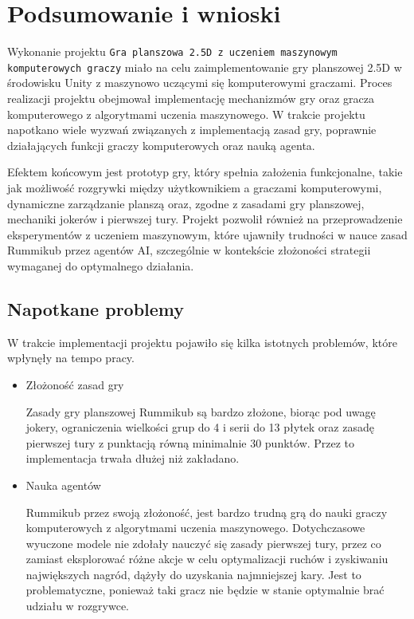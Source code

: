 \documentclass[a4paper,twoside,12pt]{book}
\begin{document}
	\chapter{Podsumowanie i wnioski}%
	Wykonanie projektu \texttt{Gra planszowa 2.5D z uczeniem maszynowym  komputerowych graczy} miało na celu zaimplementowanie gry planszowej 2.5D w środowisku Unity z maszynowo uczącymi się komputerowymi graczami. Proces realizacji projektu obejmował implementację mechanizmów gry oraz gracza komputerowego z algorytmami uczenia maszynowego. W trakcie projektu napotkano wiele wyzwań związanych z implementacją zasad gry, poprawnie działających funkcji graczy komputerowych oraz nauką agenta.
	
	Efektem końcowym jest prototyp gry, który spełnia założenia funkcjonalne, takie jak możliwość rozgrywki między użytkownikiem a graczami komputerowymi, dynamiczne zarządzanie planszą oraz, zgodne z zasadami gry planszowej, mechaniki jokerów i pierwszej tury. Projekt pozwolił również na przeprowadzenie eksperymentów z uczeniem maszynowym, które ujawniły trudności w nauce zasad Rummikub przez agentów AI, szczególnie w kontekście złożoności strategii wymaganej do optymalnego działania.
	\section{Napotkane problemy}%
	W trakcie implementacji projektu pojawiło się kilka istotnych problemów, które wpłynęły na tempo pracy.
	\begin{itemize}
		\item Złożoność zasad gry
		
		Zasady gry planszowej Rummikub są bardzo złożone, biorąc pod uwagę jokery, ograniczenia wielkości grup do 4 i serii do 13 płytek oraz zasadę pierwszej tury z punktacją równą minimalnie 30 punktów. Przez to implementacja trwała dłużej niż zakładano.
		\item Nauka agentów
		
		Rummikub przez swoją złożoność, jest bardzo trudną grą do nauki graczy komputerowych z algorytmami uczenia maszynowego. Dotychczasowe wyuczone modele nie zdołały nauczyć się zasady pierwszej tury, przez co zamiast eksplorować różne akcje w celu optymalizacji ruchów i zyskiwaniu największych nagród, dążyły do uzyskania najmniejszej kary. Jest to problematyczne, ponieważ taki gracz nie będzie w stanie optymalnie brać udziału w rozgrywce. 
	\end{itemize}
	
\end{document}
